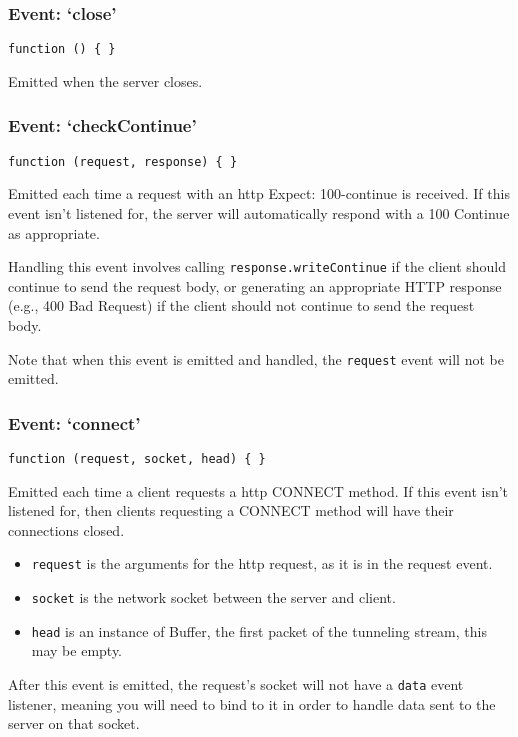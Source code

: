\subsubsection{Event: `close'}

\texttt{function () \{ \}}

Emitted when the server closes.

\subsubsection{Event: `checkContinue'}

\texttt{function (request, response) \{ \}}

Emitted each time a request with an http Expect: 100-continue is
received. If this event isn't listened for, the server will
automatically respond with a 100 Continue as appropriate.

Handling this event involves calling \texttt{response.writeContinue} if
the client should continue to send the request body, or generating an
appropriate HTTP response (e.g., 400 Bad Request) if the client should
not continue to send the request body.

Note that when this event is emitted and handled, the \texttt{request}
event will not be emitted.

\subsubsection{Event: `connect'}

\texttt{function (request, socket, head) \{ \}}

Emitted each time a client requests a http CONNECT method. If this event
isn't listened for, then clients requesting a CONNECT method will have
their connections closed.

\begin{itemize}
\item
  \texttt{request} is the arguments for the http request, as it is in
  the request event.
\item
  \texttt{socket} is the network socket between the server and client.
\item
  \texttt{head} is an instance of Buffer, the first packet of the
  tunneling stream, this may be empty.
\end{itemize}

After this event is emitted, the request's socket will not have a
\texttt{data} event listener, meaning you will need to bind to it in
order to handle data sent to the server on that socket.

